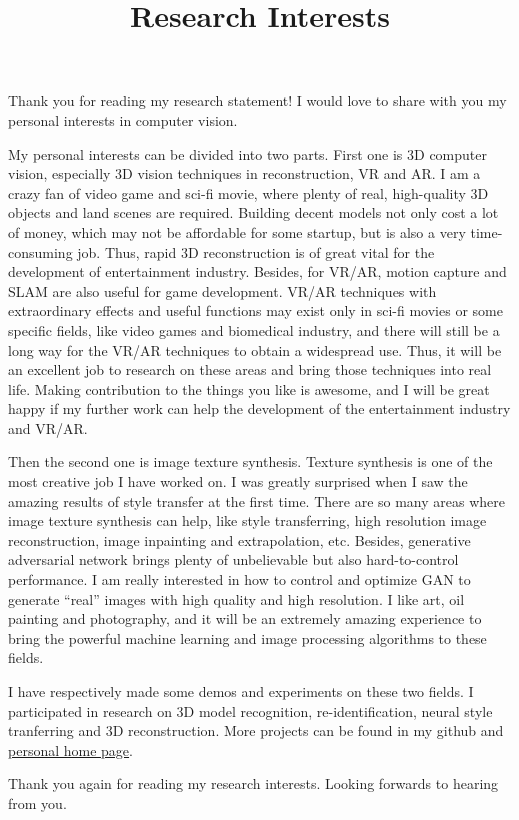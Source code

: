 \documentclass[12pt]{article}
\begin{document}
\title{Research Interests}
\date{\vspace{-10ex}}
\maketitle

Thank you for reading my research statement! I would love to share with you my personal interests in computer vision.


My personal interests can be divided into two parts. First one is 3D computer vision, especially 3D vision techniques in reconstruction, VR and AR. I am a crazy fan of video game and sci-fi movie, where plenty of real, high-quality 3D objects and land scenes are required. Building decent models not only cost a lot of money, which may not be affordable for some startup, but is also a very time-consuming job. Thus, rapid 3D reconstruction is of great vital for the development of entertainment industry. Besides, for VR/AR, motion capture and SLAM are also useful for game development. VR/AR techniques with extraordinary effects and useful functions may exist only in sci-fi movies or some specific fields, like video games and biomedical industry, and there will still be a long way for the VR/AR techniques to obtain a widespread use. Thus, it will be an excellent job to research on these areas and bring those techniques into real life. Making contribution to the things you like is awesome, and I will be great happy if my further work can help the development of the entertainment industry and VR/AR.


Then the second one is image texture synthesis. Texture synthesis is one of the most creative job I have worked on. I was greatly surprised when I saw the amazing results of style transfer at the first time. There are so many areas where image texture synthesis can help, like style transferring, high resolution image reconstruction, image inpainting and extrapolation, etc. Besides, generative adversarial network brings plenty of unbelievable but also hard-to-control performance. I am really interested in how to control and optimize GAN to generate ``real'' images with high quality and high resolution. I like art, oil painting and photography, and it will be an extremely amazing experience to bring the powerful machine learning and image processing algorithms to these fields.


I have respectively made some demos and experiments on these two fields. I participated in research on 3D model recognition, re-identification, neural style tranferring and 3D reconstruction. More projects can be found in my github and \href{https://lewkesy.github.io}{personal home page}.


Thank you again for reading my research interests. Looking forwards to hearing from you.
\end{document}
